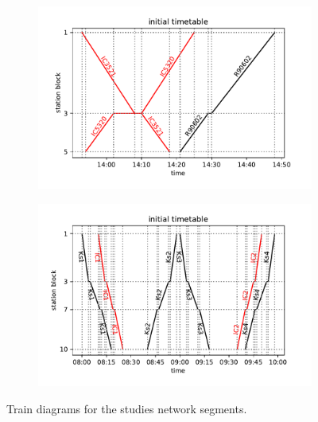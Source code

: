 \begin{figure}
  \begin{subfigure}[t]{\textwidth}
	\includegraphics[width=\textwidth]{figures/train_diagram_small}
	\label{fig::small_diagram}
  \end{subfigure}
  \begin{subfigure}[t]{\textwidth}
    \includegraphics[width=\textwidth]{figures/train_diagram}
    \label{fig::diagram}
  \end{subfigure}
  \caption{Train diagrams for the studies network segments.}
  \label{fig:timetables}
\end{figure}


